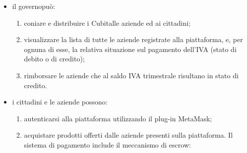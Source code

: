 \begin{itemize}
	\item il governo\glosp può:
	\begin{enumerate}[label=\alph*.]
		\item coniare e distribuire i Cubit\glosp alle aziende ed ai cittadini;
		\item visualizzare la lista di tutte le aziende registrate alla piattaforma, e, per ognuna di esse, la relativa situazione sul pagamento dell'IVA (stato di debito o di credito); 
		\item rimborsare le aziende che al saldo IVA trimestrale risultano in stato di credito.
	\end{enumerate}
	\item i cittadini e le aziende possono:
	\begin{enumerate}[label=\alph*.]
		\item autenticarsi alla piattaforma utilizzando il plug-in MetaMask\glo;
		\item acquistare prodotti offerti dalle aziende presenti sulla piattaforma. Il sistema di pagamento include il meccanismo di escrow\glo:
		

\end{enumerate}
\end{itemize}
